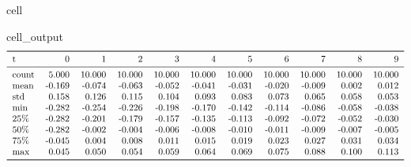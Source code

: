 \documentclass[letterpaper,table,10pt,english]{jupyterBook}
\begin{document}
\begin{sphinxuseclass}{cell}
\begin{sphinxVerbatimOutput}
\begin{sphinxuseclass}{cell_output}\begin{equation*}
\begin{split}\begin{tabular}{lrrrrrrrrrr}
\toprule
t &      0 &       1 &       2 &       3 &       4 &       5 &       6 &       7 &       8 &       9 \\
\midrule
count &  5.000 &  10.000 &  10.000 &  10.000 &  10.000 &  10.000 &  10.000 &  10.000 &  10.000 &  10.000 \\
mean  & -0.169 &  -0.074 &  -0.063 &  -0.052 &  -0.041 &  -0.031 &  -0.020 &  -0.009 &   0.002 &   0.012 \\
std   &  0.158 &   0.126 &   0.115 &   0.104 &   0.093 &   0.083 &   0.073 &   0.065 &   0.058 &   0.053 \\
min   & -0.282 &  -0.254 &  -0.226 &  -0.198 &  -0.170 &  -0.142 &  -0.114 &  -0.086 &  -0.058 &  -0.038 \\
25\%   & -0.282 &  -0.201 &  -0.179 &  -0.157 &  -0.135 &  -0.113 &  -0.092 &  -0.072 &  -0.052 &  -0.030 \\
50\%   & -0.282 &  -0.002 &  -0.004 &  -0.006 &  -0.008 &  -0.010 &  -0.011 &  -0.009 &  -0.007 &  -0.005 \\
75\%   & -0.045 &   0.004 &   0.008 &   0.011 &   0.015 &   0.019 &   0.023 &   0.027 &   0.031 &   0.034 \\
max   &  0.045 &   0.050 &   0.054 &   0.059 &   0.064 &   0.069 &   0.075 &   0.088 &   0.100 &   0.113 \\
\bottomrule
\end{tabular}\end{split}
\end{equation*}
\end{sphinxuseclass}\end{sphinxVerbatimOutput}

\end{sphinxuseclass}
\end{document}
